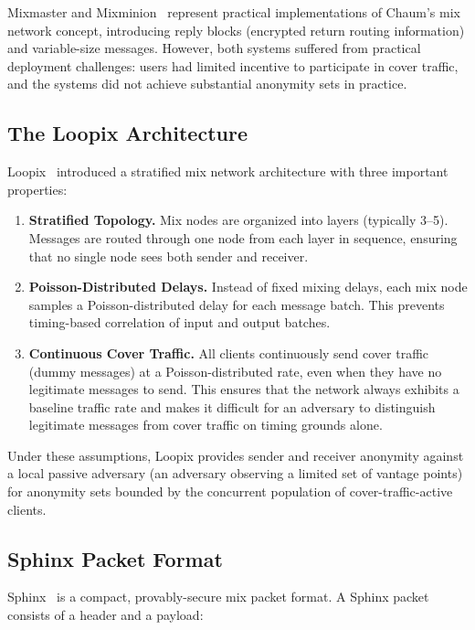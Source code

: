\documentclass[11pt]{article}
\theoremstyle{definition}
\theoremstyle{remark}
\begin{document}
Mixmaster and Mixminion~\cite{mixmaster2003} represent practical implementations of Chaum's mix network concept, introducing reply blocks (encrypted return routing information) and variable-size messages. However, both systems suffered from practical deployment challenges: users had limited incentive to participate in cover traffic, and the systems did not achieve substantial anonymity sets in practice.

\subsection{The Loopix Architecture}

Loopix~\cite{loopix2017} introduced a stratified mix network architecture with three important properties:

\begin{enumerate}
    \item \textbf{Stratified Topology.} Mix nodes are organized into layers (typically 3--5). Messages are routed through one node from each layer in sequence, ensuring that no single node sees both sender and receiver.

    \item \textbf{Poisson-Distributed Delays.} Instead of fixed mixing delays, each mix node samples a Poisson-distributed delay for each message batch. This prevents timing-based correlation of input and output batches.

    \item \textbf{Continuous Cover Traffic.} All clients continuously send cover traffic (dummy messages) at a Poisson-distributed rate, even when they have no legitimate messages to send. This ensures that the network always exhibits a baseline traffic rate and makes it difficult for an adversary to distinguish legitimate messages from cover traffic on timing grounds alone.
\end{enumerate}

Under these assumptions, Loopix provides sender and receiver anonymity against a local passive adversary (an adversary observing a limited set of vantage points) for anonymity sets bounded by the concurrent population of cover-traffic-active clients.

\subsection{Sphinx Packet Format}

Sphinx~\cite{sphinx2009} is a compact, provably-secure mix packet format. A Sphinx packet consists of a header and a payload:
\end{document}
